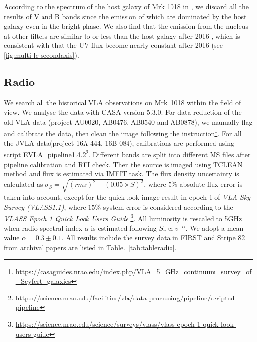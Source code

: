 \documentclass[twocolumn]{aastex63}
\begin{document}
According to the spectrum of the host galaxy of Mrk 1018 in \citep{2018MNRAS.480.3898N}, we discard all the results of V and B bands since the emission of which are dominated by the host galaxy even in the bright phase. We also find that the emission from the nucleus at other filters are similar to or less than the host galaxy after 2016 \citep{2018MNRAS.480.3898N}, which is consistent with that the UV flux become nearly constant after 2016 (see \autoref{fig:multi-lc-secondaxis}). 








\subsection{Radio}
We search all the historical VLA observations on Mrk~1018 within the field of view. We analyse the data with CASA version 5.3.0\citep{2007ASPC..376..127M}. For data reduction of the old VLA data (project AU0020, AB0476, AB0540 and AB0878), we manually flag and calibrate the data, then clean the image following the instruction\footnote{\url{https://casaguides.nrao.edu/index.php/VLA_5_GHz_continuum_survey_of_Seyfert_galaxies}}. For all the JVLA data(project 16A-444, 16B-084), calibrations are performed using script EVLA\_pipeline1.4.2\footnote{\url{https://science.nrao.edu/facilities/vla/data-processing/pipeline/scripted-pipeline}}. Different bands are split into different MS files after pipeline calibration and RFI check. Then the source is imaged using TCLEAN method and flux is estimated via IMFIT task. The flux density uncertainty is calculated as $\sigma_{S}=\sqrt{(rms)^2+(0.05\times S)^2}$, where $5 \%$ absolute flux error is taken into account, except for the quick look image result in epoch 1 of  {\em VLA Sky Survey (VLASS1.1)}, where $15 \%$ system error is considered according to the {\em VLASS Epoch 1 Quick Look Users Guide} \footnote{\url{https://science.nrao.edu/science/surveys/vlass/vlass-epoch-1-quick-look-users-guide}}. All luminosity is rescaled to 5GHz when radio spectral index $\alpha$  is estimated following $S_v \propto v^{-\alpha}$. We adopt a mean value $\alpha = 0.3\pm{0.1}$. All results include the survey data in FIRST\citep{1994ASPC...61..165B,1995ApJ...450..559B} and Stripe 82\citep{2011AJ....142....3H} from archival papers are listed in Table.~\ref{tab:tableradio}.
\end{document}
